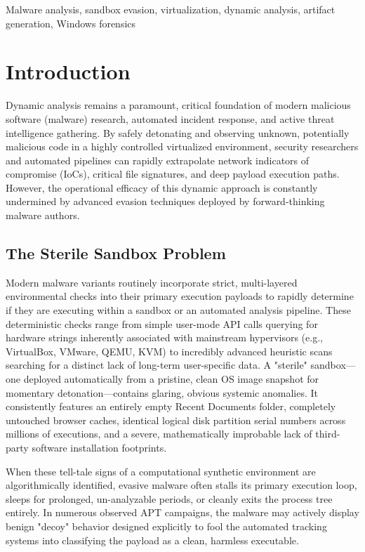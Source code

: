 \documentclass{ieeeaccess}
\begin{document}
\begin{keywords}
Malware analysis, sandbox evasion, virtualization, dynamic analysis, artifact generation, Windows forensics
\end{keywords}

\maketitle

\section{Introduction}

Dynamic analysis remains a paramount, critical foundation of modern malicious software (malware) research, automated incident response, and active threat intelligence gathering. By safely detonating and observing unknown, potentially malicious code in a highly controlled virtualized environment, security researchers and automated pipelines can rapidly extrapolate network indicators of compromise (IoCs), critical file signatures, and deep payload execution paths. However, the operational efficacy of this dynamic approach is constantly undermined by advanced evasion techniques deployed by forward-thinking malware authors.

\subsection{The Sterile Sandbox Problem}
Modern malware variants routinely incorporate strict, multi-layered environmental checks into their primary execution payloads to rapidly determine if they are executing within a sandbox or an automated analysis pipeline. These deterministic checks range from simple user-mode API calls querying for hardware strings inherently associated with mainstream hypervisors (e.g., VirtualBox, VMware, QEMU, KVM) to incredibly advanced heuristic scans searching for a distinct lack of long-term user-specific data. A "sterile" sandbox—one deployed automatically from a pristine, clean OS image snapshot for momentary detonation—contains glaring, obvious systemic anomalies. It consistently features an entirely empty Recent Documents folder, completely untouched browser caches, identical logical disk partition serial numbers across millions of executions, and a severe, mathematically improbable lack of third-party software installation footprints. 

When these tell-tale signs of a computational synthetic environment are algorithmically identified, evasive malware often stalls its primary execution loop, sleeps for prolonged, un-analyzable periods, or cleanly exits the process tree entirely. In numerous observed APT campaigns, the malware may actively display benign "decoy" behavior designed explicitly to fool the automated tracking systems into classifying the payload as a clean, harmless executable.
\end{document}
